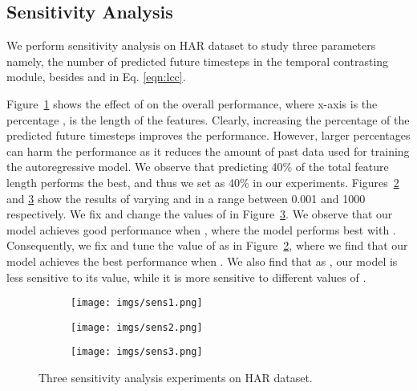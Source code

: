 \documentclass{article}
\begin{document}
\subsection{Sensitivity Analysis}
\label{sec:sens_analysis}
We perform sensitivity analysis on HAR dataset to study three parameters namely, the number of predicted future timesteps  in the temporal contrasting module, besides  and  in Eq. \ref{eqn:lcc}.

Figure~\ref{fig:sens1} shows the effect of  on the overall performance, where x-axis is the percentage ,  is the length of the features. Clearly, increasing the percentage of the predicted future timesteps improves the performance. However, larger percentages can harm the performance as it reduces the amount of past data used for training the autoregressive model. We observe that predicting 40\% of the total feature length performs the best, and thus we set  as 40\% in our experiments. Figures~\ref{fig:sens2} and \ref{fig:sens3} show the results of varying  and  in a range between 0.001 and 1000 respectively. We fix  and change the values of  in Figure~\ref{fig:sens3}. We observe that our model achieves good performance when , where the model performs best with . 
Consequently, we fix  and tune the value of  as in Figure~\ref{fig:sens2}, where we find that our model achieves the best performance when . We also find that as , our model is less sensitive to its value, while it is more sensitive to different values of .





\begin{figure*}
     \centering
     \begin{subfigure}[b]{0.3\textwidth}
         \centering
         \texttt{[image: imgs/sens1.png]}
         \caption{}
         \label{fig:sens1}
     \end{subfigure}
     \hfill
     \begin{subfigure}[b]{0.3\textwidth}
         \centering
         \texttt{[image: imgs/sens2.png]}
         \caption{}
         \label{fig:sens2}
     \end{subfigure}
     \hfill
     \begin{subfigure}[b]{0.3\textwidth}
         \centering
         \texttt{[image: imgs/sens3.png]}
         \caption{}
         \label{fig:sens3}
     \end{subfigure}
        \caption{Three sensitivity analysis experiments on HAR dataset.}
        \label{Fig:ts_sens_analysis}
\end{figure*}
\end{document}
